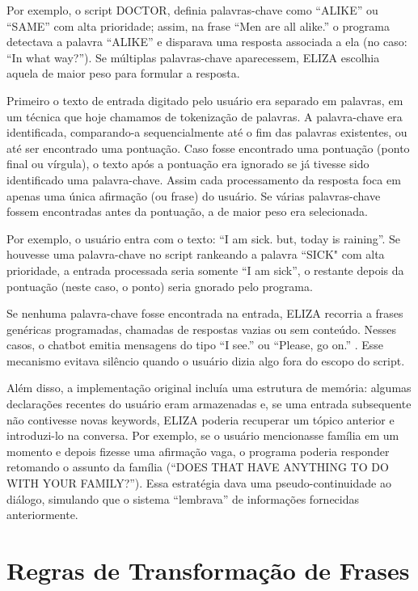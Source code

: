 \documentclass[14pt,a4paper,oneside]{book}
\begin{document}
Por exemplo, o script DOCTOR, definia palavras-chave como “ALIKE” ou “SAME” com alta prioridade; assim, na frase “Men are all alike.” o programa detectava a palavra “ALIKE” e disparava uma resposta associada a ela (no caso: “In what way?”). 
Se múltiplas palavras-chave aparecessem, ELIZA escolhia aquela de maior peso para formular a resposta.

Primeiro o texto de entrada digitado pelo usuário era separado em palavras, em um técnica que hoje chamamos de tokenização de palavras. A palavra-chave era identificada, comparando-a sequencialmente até o fim das palavras existentes, ou até ser encontrado uma pontuação. Caso fosse encontrado uma pontuação (ponto final ou vírgula), o texto após a pontuação era ignorado se já tivesse sido identificado uma palavra-chave. Assim cada processamento da resposta foca em apenas uma única afirmação (ou frase) do usuário. Se várias palavras-chave fossem encontradas antes da pontuação, a de maior peso era selecionada.

Por exemplo, o usuário entra com o texto: “I am sick. but, today is raining”. Se houvesse uma palavra-chave no script rankeando a palavra “SICK" com alta prioridade, a entrada processada seria somente “I am sick”, o restante depois da pontuação (neste caso, o ponto) seria gnorado pelo programa.

Se nenhuma palavra-chave fosse encontrada na entrada, ELIZA recorria a frases genéricas programadas, chamadas de respostas vazias ou sem conteúdo. Nesses casos, o chatbot emitia mensagens do tipo “I see.” ou “Please, go on.” . Esse mecanismo evitava silêncio quando o usuário dizia algo fora do escopo do script.

Além disso, a implementação original incluía uma estrutura de memória: algumas declarações recentes do usuário eram armazenadas e, se uma entrada subsequente não contivesse novas keywords, ELIZA poderia recuperar um tópico anterior e introduzi-lo na conversa.
Por exemplo, se o usuário mencionasse família em um momento e depois fizesse uma afirmação vaga, o programa poderia responder retomando o assunto da família (“DOES THAT HAVE ANYTHING TO DO WITH YOUR FAMILY?”).
Essa estratégia dava uma pseudo-continuidade ao diálogo, simulando que o sistema “lembrava” de informações fornecidas anteriormente.

\section{Regras de Transformação de Frases}
\end{document}
